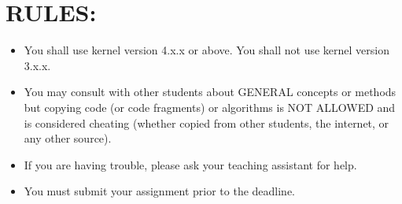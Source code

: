 \documentclass{article}
\begin{document}
\section*{RULES:}

\begin{itemize}
    \item You shall use kernel version 4.x.x or above. You shall not use kernel version 3.x.x.
    \item You may consult with other students about GENERAL concepts or methods but copying code (or code fragments) or algorithms is NOT ALLOWED and is considered cheating (whether copied from other students, the internet, or any other source).
    \item If you are having trouble, please ask your teaching assistant for help.
    \item You must submit your assignment prior to the deadline.
\end{itemize}
\end{document}
